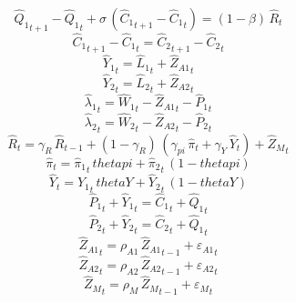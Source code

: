 \begin{dmath}
{{\hat{Q}_{1}}}_{t+1}-{{\hat{Q}_{1}}}_{t}+{{\sigma}}\, \left({{\hat{C}_{1}}}_{t+1}-{{\hat{C}_{1}}}_{t}\right)=\left(1-{{\beta}}\right)\, {{\hat{R}}}_{t}
\end{dmath}
\begin{dmath}
{{\hat{C}_{1}}}_{t+1}-{{\hat{C}_{1}}}_{t}={{\hat{C}_{2}}}_{t+1}-{{\hat{C}_{2}}}_{t}
\end{dmath}
\begin{dmath}
{{\hat{Y}_{1}}}_{t}={{\hat{L}_{1}}}_{t}+{{\hat{Z}_{A1}}}_{t}
\end{dmath}
\begin{dmath}
{{\hat{Y}_{2}}}_{t}={{\hat{L}_{2}}}_{t}+{{\hat{Z}_{A2}}}_{t}
\end{dmath}
\begin{dmath}
{{\hat{\lambda}_{1}}}_{t}={{\hat{W}_{1}}}_{t}-{{\hat{Z}_{A1}}}_{t}-{{\hat{P}_{1}}}_{t}
\end{dmath}
\begin{dmath}
{{\hat{\lambda}_{2}}}_{t}={{\hat{W}_{2}}}_{t}-{{\hat{Z}_{A2}}}_{t}-{{\hat{P}_{2}}}_{t}
\end{dmath}
\begin{dmath}
{{\hat{R}}}_{t}={{\gamma_{R}}}\, {{\hat{R}}}_{t-1}+\left(1-{{\gamma_{R}}}\right)\, \left({{\gamma_{pi}}}\, {{\hat{\pi}}}_{t}+{{\gamma_{Y}}}\, {{\hat{Y}}}_{t}\right)+{{\hat{Z}_M}}_{t}
\end{dmath}
\begin{dmath}
{{\hat{\pi}}}_{t}={{\hat{\pi}_{1}}}_{t}\, {thetapi}+{{\hat{\pi}_{2}}}_{t}\, \left(1-{thetapi}\right)
\end{dmath}
\begin{dmath}
{{\hat{Y}}}_{t}={{\hat{Y}_{1}}}_{t}\, {thetaY}+{{\hat{Y}_{2}}}_{t}\, \left(1-{thetaY}\right)
\end{dmath}
\begin{dmath}
{{\hat{P}_{1}}}_{t}+{{\hat{Y}_{1}}}_{t}={{\hat{C}_{1}}}_{t}+{{\hat{Q}_{1}}}_{t}
\end{dmath}
\begin{dmath}
{{\hat{P}_{2}}}_{t}+{{\hat{Y}_{2}}}_{t}={{\hat{C}_{2}}}_{t}+{{\hat{Q}_{1}}}_{t}
\end{dmath}
\begin{dmath}
{{\hat{Z}_{A1}}}_{t}={{\rho_{A1}}}\, {{\hat{Z}_{A1}}}_{t-1}+{{\varepsilon_{A1}}}_{t}
\end{dmath}
\begin{dmath}
{{\hat{Z}_{A2}}}_{t}={{\rho_{A2}}}\, {{\hat{Z}_{A2}}}_{t-1}+{{\varepsilon_{A2}}}_{t}
\end{dmath}
\begin{dmath}
{{\hat{Z}_M}}_{t}={{\rho_{M}}}\, {{\hat{Z}_M}}_{t-1}+{{\varepsilon_{M}}}_{t}
\end{dmath}
